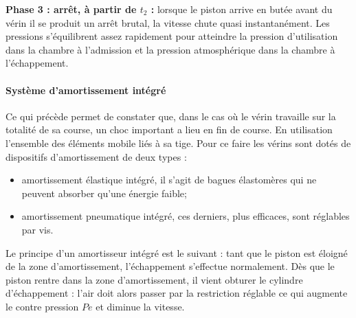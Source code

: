 \documentclass[10pt]{article}
\begin{document}
\textbf{Phase 3 : arrêt, à partir de $t_2$ :} lorsque le piston arrive en butée avant du vérin il se produit un arrêt brutal, la vitesse chute quasi instantanément. Les pressions s'équilibrent assez rapidement pour atteindre la pression d'utilisation dans la chambre à l'admission et la pression atmosphérique dans la chambre à l'échappement. 

\paragraph{Système d'amortissement intégré}
\begin{minipage}[c]{.63\linewidth}
Ce qui précède permet de constater que, dans le cas où le vérin travaille sur la totalité de sa course, un choc important a lieu en fin de course. En utilisation l'ensemble des éléments mobile liés à sa tige. Pour ce faire les vérins sont dotés de dispositifs d'amortissement de deux types : 
\begin{itemize}
\item amortissement élastique intégré, il s'agit de bagues élastomères qui ne peuvent absorber qu'une énergie faible;
\item amortissement pneumatique intégré, ces derniers, plus efficaces, sont réglables par vis. 
\end{itemize}

Le principe d'un amortisseur intégré est le suivant : tant que le piston est éloigné de la zone d'amortissement, l'échappement s'effectue normalement. Dès que le piston rentre dans la zone d'amortissement, il vient obturer le cylindre d'échappement : l'air doit alors passer par la restriction réglable ce qui augmente le contre pression $Pe$ et diminue la vitesse. 
\end{minipage} \hfill
\end{document}
